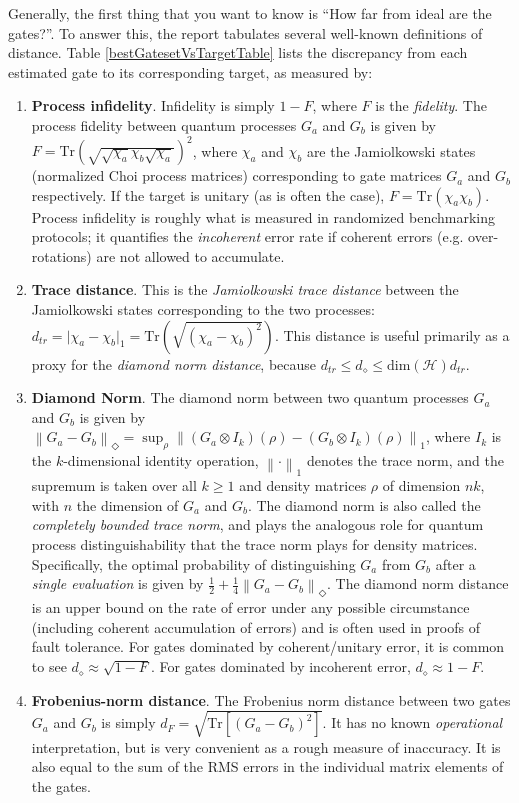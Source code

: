 \documentclass{article}[11pt]
\newcommand{\norm}[1]{\left\lVert#1\right\rVert}
\newcommand{\Tr}[0]{\mathrm{Tr}}
\begin{document}
Generally, the first thing that you want to know is ``How far from ideal are the gates?''.  To answer this, the report tabulates several well-known definitions of distance.  Table \ref{bestGatesetVsTargetTable} lists the discrepancy from each estimated gate to its corresponding target, as measured by:
\begin{enumerate}
\item \textbf{Process infidelity}.  Infidelity is simply $1-F$, where $F$ is the \emph{fidelity}.  The process fidelity between quantum processes $G_a$ and $G_b$ is given by $F = \Tr\left( \sqrt{ \sqrt{\chi_a} \chi_b \sqrt{\chi_a} } \right)^2$, where $\chi_a$ and $\chi_b$ are the Jamiolkowski states (normalized Choi process matrices) corresponding to gate matrices $G_a$ and $G_b$ respectively.  If the target is unitary (as is often the case), $F = \Tr\left( \chi_a \chi_b \right)$.  Process infidelity is roughly what is measured in randomized benchmarking protocols; it quantifies the \emph{incoherent} error rate if coherent errors (e.g. over-rotations) are not allowed to accumulate.
\item \textbf{Trace distance}.  This is the \emph{Jamiolkowski trace distance} between the Jamiolkowski states corresponding to the two processes:  $d_{tr} = \vert\chi_a - \chi_b\vert_1 = \Tr\left(\sqrt{(\chi_a-\chi_b)^2}\right)$.  This distance is useful primarily as a proxy for the \emph{diamond norm distance}, because $d_{tr} \leq d_{\diamond} \leq \mathrm{dim}(\mathcal{H}) d_{tr}$.
\item \textbf{Diamond Norm}.  The diamond norm between two quantum processes $G_a$ and $G_b$ is given by $\norm{G_a - G_b}_\Diamond = \sup_\rho \norm{(G_a \otimes I_k)(\rho) - (G_b \otimes I_k)(\rho)}_1$, where $I_k$ is the $k$-dimensional identity operation, $\norm{\cdot}_1$ denotes the trace norm, and the supremum is taken over all $k \ge 1$ and density matrices $\rho$ of dimension $nk$, with $n$ the dimension of $G_a$ and $G_b$.  The diamond norm is also called the \emph{completely bounded trace norm}, and plays the analogous role for quantum process distinguishability that the trace norm plays for density matrices.  Specifically, the optimal probability of distinguishing $G_a$ from $G_b$ after a \emph{single evaluation} is given by $\frac{1}{2} + \frac{1}{4}\norm{G_a - G_b}_\Diamond$.  The diamond norm distance is an upper bound on the rate of error under any possible circumstance (including coherent accumulation of errors) and is often used in proofs of fault tolerance.  For gates dominated by coherent/unitary error, it is common to see $d_{\diamond} \approx \sqrt{1-F}$.  For gates dominated by incoherent error, $d_{\diamond} \approx 1-F$.
\item \textbf{Frobenius-norm distance}.  The Frobenius norm distance between two gates $G_a$ and $G_b$ is simply $d_F = \sqrt{\Tr\left[\left(G_a-G_b\right)^2\right]}$.  It has no known \emph{operational} interpretation, but is very convenient as a rough measure of inaccuracy.  It is also equal to the sum of the RMS errors in the individual matrix elements of the gates.
\end{enumerate}
\end{document}
